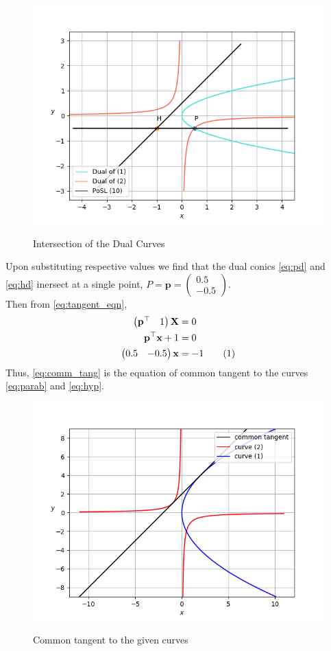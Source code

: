 \documentclass[journal,12pt,twocolumn]{IEEEtran}
\let\vec\mathbf
\newcommand{\myvec}[1]{\ensuremath{\begin{pmatrix}#1\end{pmatrix}}}
\newcommand\numberthis{\addtocounter{equation}{1}\tag{\theequation}}
\begin{document}
\begin{figure}[h]
\centering
%
\includegraphics[width=\columnwidth]{figs/dual_int.png}
\label{fig:dual_int}
\caption{Intersection of the Dual Curves}
\end{figure}

Upon substituting respective values we find that the dual conics \eqref{eq:pd} and \eqref{eq:hd} inersect at a single point, $P=\vec{p}=\myvec{0.5\\-0.5}$. 
\\[0.7ex]
Then from \eqref{eq:tangent_eqn}, 
\begin{align*}
		\myvec{\vec{p^{\top}}&1}\vec{X} &= 0 \\
		\vec{p^{\top}}\vec{x} + 1 &= 0 \\
		\myvec{0.5&-0.5}\vec{x} &= -1 \label{eq:comm_tang} \numberthis
\end{align*}
Thus, \eqref{eq:comm_tang} is the equation of common tangent to the curves \eqref{eq:parab} and \eqref{eq:hyp}.
\newpage

\begin{figure}[h!]
\centering
%
\includegraphics[width=\columnwidth]{figs/comm_tan.png}
\label{fig:comm_tan}
\caption{Common tangent to the given curves}
\end{figure}
\end{document}
